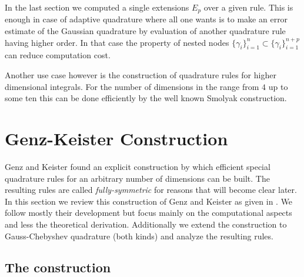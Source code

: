 \documentclass[a4paper,10pt]{article}
\begin{document}
In the last section we computed a single extensions $E_p$ over a
given rule. This is enough in case of adaptive quadrature where all one
wants is to make an error estimate of the Gaussian quadrature by evaluation
of another quadrature rule having higher order. In that case the property of
nested nodes $\{\gamma_i\}_{i=1}^n \subset \{\gamma_i\}_{i=1}^{n+p}$ can reduce
computation cost.

Another use case however is the construction of quadrature
rules for higher dimensional integrals. For the number of dimensions in the
range from $4$ up to some ten this can be done efficiently by the well known
Smolyak construction.








\section{Genz-Keister Construction}


Genz and Keister found an explicit construction by which efficient
special quadrature rules for an arbitrary number
of dimensions can be built. The resulting rules are
called \emph{fully-symmetric} for reasons that will become
clear later. In this section we review this construction of Genz
and Keister as given in \cite{genz, genz_keister}. We follow mostly their
development but focus mainly on the computational aspects and less
the theoretical derivation. Additionally we extend the construction
to Gauss-Chebyshev quadrature (both kinds) and analyze the resulting rules.


\subsection{The construction}
\end{document}
